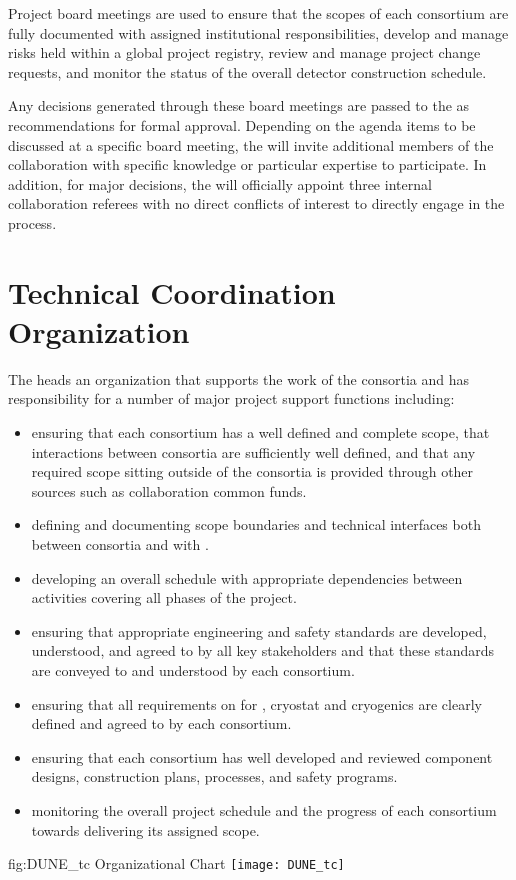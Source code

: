 Project board meetings are used to ensure that the scopes of each
consortium are fully documented with assigned institutional
responsibilities, develop and manage risks held within a global
project registry, review and manage project change requests, and
monitor the status of the overall detector construction schedule.

Any decisions generated through these board meetings are passed to 
the   as recommendations for formal approval.
Depending on the agenda items to be discussed at a specific board 
meeting, the  will invite additional members of the 
collaboration with specific knowledge or particular expertise to 
participate.  In addition, for major decisions, the  
will officially appoint three internal collaboration referees with 
no direct conflicts of interest to directly engage in the process.

\section{Technical Coordination Organization}
\label{sec:tco}

The  heads an organization that supports the work of 
the consortia and has responsibility for a number of major project 
support functions including:
\begin{itemize}
\item ensuring that each consortium has a well defined and complete
  scope, that interactions between consortia are sufficiently 
  well defined, and that any required scope sitting outside of the 
  consortia is provided through other sources such as collaboration
  common funds.
\item defining and documenting scope boundaries and technical 
  interfaces both between consortia and with .  
\item developing an overall schedule with appropriate dependencies
  between activities covering all phases of the project. 
\item ensuring that appropriate engineering and safety standards 
  are developed, understood, and agreed to by all key stakeholders 
  and that these standards are conveyed to and understood by each
   consortium.
\item ensuring that all  requirements on  
  for , cryostat and cryogenics are clearly
  defined and agreed to by each consortium.
\item ensuring that each consortium has well developed and reviewed
  component designs, construction plans,  processes, and 
  safety programs.
\item monitoring the overall project schedule and the progress 
  of each consortium towards delivering its assigned scope. 
\end{itemize}
\begin{dunefigure}{fig:DUNE_tc}
  {  Organizational Chart}
  \texttt{[image: DUNE\_tc]}
\end{dunefigure}

